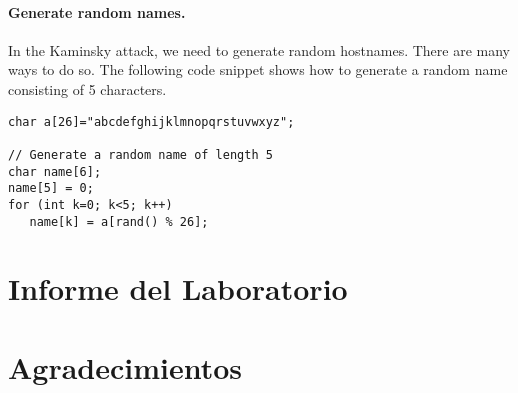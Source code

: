 \paragraph{Generate random names.} In the Kaminsky attack, we need to 
generate random hostnames. There are many ways to do so. The following 
code snippet shows how to generate a random name consisting of 
5 characters. 

\begin{lstlisting}
char a[26]="abcdefghijklmnopqrstuvwxyz";

// Generate a random name of length 5
char name[6];
name[5] = 0;
for (int k=0; k<5; k++)  
   name[k] = a[rand() % 26];
\end{lstlisting}
 



\section{Informe del Laboratorio}




\section*{Agradecimientos}




\thispagestyle{empty}

\def\baselinestretch{1}









